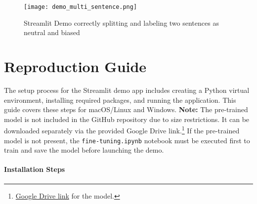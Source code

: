         \begin{figure}[H]
            \centering
            \texttt{[image: demo\_multi\_sentence.png]}
            \caption[Streamlit Demo: Multi Sentence Translation]{Streamlit Demo correctly splitting and labeling two sentences as neutral and biased}
            \label{fig:demo_multi_sentence}
        \end{figure}
        \vspace{0.8em}

\section{Reproduction Guide} \label{section:reproduction_guide}
   The setup process for the Streamlit demo app includes creating a Python virtual environment, installing required packages, and running the application. This guide covers these steps for macOS/Linux and Windows. \textbf{Note:} The pre-trained model is not included in the GitHub repository due to size restrictions. It can be downloaded separately via the provided Google Drive link.\footnote{ \href{https://drive.google.com/drive/folders/11WMb0od_U_sQsUGD0t4DjQwcefI3r_kK?usp=sharing}{Google Drive link} for the model.} If the pre-trained model is not present, the \texttt{fine-tuning.ipynb} notebook must be executed first to train and save the model before launching the demo.
\paragraph{Installation Steps}

